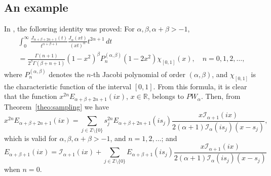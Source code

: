 \documentclass[11pt]{amsart}
\theoremstyle{plain}
\begin{document}
\subsection*{An example}

In \cite{CGPV}, the following identity was proved: For $\alpha, \beta, \alpha+\beta > -1$,
\begin{multline*}
  \int_0^{\infty} \frac{J_{\alpha+\beta+2n+1}(t)}{t^{\alpha+\beta+1}}
  \frac{J_{\alpha}(xt)}{(xt)^{\alpha}}t^{2\alpha+1}\,dt \\
  = \frac{\Gamma(n+1)}{2^{\beta}\Gamma(\beta+n+1)}(1-x^2)^{\beta}
    P_n^{(\alpha,\beta)}(1-2x^2) \chi_{[0,1]}(x),
  \quad n = 0,1,2,\dots,
\end{multline*}
where $P_n^{(\alpha,\beta)}$ denotes the $n$-th Jacobi polynomial of order $(\alpha,\beta)$,
and $\chi_{[0,1]}$ is the characteristic function of the interval $[0,1]$.
From this formula, it is clear that the function
$x^{2n}E_{\alpha+\beta+2n+1}(ix)$, $x\in\mathbb{R}$, belongs to $PW_{\alpha}$.
Then, from Theorem~\ref{theo:sampling} we have
\[
  x^{2n} E_{\alpha+\beta+2n+1}(ix) = \sum_{j\in\mathbb{Z} \setminus\{0\}} 
    s_j^{2n} E_{\alpha+\beta+2n+1}(i s_j)
    \frac{x\mathcal{I}_{\alpha+1}(ix)}{2(\alpha+1)\mathcal{I}_{\alpha}(is_j)(x-s_j)},
\]
which is valid for $\alpha, \beta, \alpha+\beta>-1$, and $n = 1,2,\dots$; and
\[
  E_{\alpha+\beta+1}(ix) = \mathcal{I}_{\alpha+1}(ix) 
    + \sum_{j\in\mathbb{Z} \setminus\{0\}} 
    E_{\alpha+\beta+1}(i s_j)
    \frac{x\mathcal{I}_{\alpha+1}(ix)}{2(\alpha+1)\mathcal{I}_{\alpha}(is_j)(x-s_j)}
\]
when $n=0$.
\end{document}
